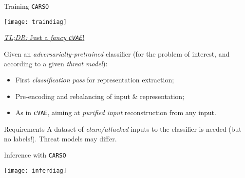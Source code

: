 {    \begin{frame}{ Training \texttt{CARSO}}
        \begin{minipage}[]{0.5\textwidth}
            \vspace{0px}
            \texttt{[image: traindiag]}
        \end{minipage}
        \begin{minipage}[]{0.45\textwidth}
            \vspace{0pt}

            \begin{center}
                \underline{\textit{TL;DR:} Just a \textit{fancy \texttt{cVAE}}!}
            \end{center}

            Given an \textit{\alert{adversarially}-pretrained} classifier (for the problem of interest, and according to a given \textit{\alert{threat model}}):
            \hfill\break
            \begin{itemize}
                \item First \textit{classification pass} for representation \alert{extraction};
                \item Pre-encoding and \alert{rebalancing} of input \& representation;
                \item As in \texttt{cVAE}, aiming at \textit{\alert{purified} input} reconstruction from any input.
            \end{itemize}

        \begin{block}{Requirements}
            A dataset of \textit{clean/attacked} inputs to the classifier is needed (but \alert{no labels}!). Threat models may differ.
        \end{block}

        \end{minipage}
    \end{frame}

    \begin{frame}{ Inference with \texttt{CARSO}}
        \begin{minipage}[]{0.5\textwidth}
            \vspace{0px}
            \texttt{[image: inferdiag]}
        \end{minipage}
        \begin{minipage}[]{0.45\textwidth}
    \vspace{0pt}


\end{minipage}
\end{frame}}
